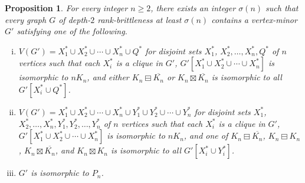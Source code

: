 \documentclass[11pt]{article}
\newtheorem{proposition}[theorem]{Proposition}
\newcommand\mat{\boxminus}
\newcommand\antimat{\boxtimes}
\def\S_#1{\overline{K_{#1}}}
\begin{document}
        
		\begin{proposition}\label{prop:main2}
		For every integer $n\ge 2$, there exists an integer $\sigma(n)$ such that 
                every graph $G$ of depth-$2$ rank-brittleness at least  $\sigma(n)$ contains a vertex-minor $G'$ satisfying one of the following.
                \begin{enumerate}[(i)]
                \item $V(G')=X_1^*\cup X_2^*\cup\cdots \cup X_n^*\cup Q^*$
                  for disjoint sets $X_1^*$, $X_2^*,\ldots, X_n^*,Q^*$ of $n$ vertices
                  such
                  that each $X_i^*$ is a clique in $G'$,
                  $G'[X_1^*\cup X_2^*\cup \cdots \cup X_n^*]$ is isomorphic to $nK_n$,
                  and
                  either $K_n\mat \S_n$ or $K_n\antimat \S_n$
                  is isomorphic to all $G'[X_i^*\cup Q^*]$.
                \item $V(G')=X_1^*\cup X_2^*\cup\cdots \cup X_n^*\cup Y_1^*
                  \cup Y_2^*\cup\cdots\cup Y_n^*$
                  for disjoint sets $X_1^*$, $X_2^*,\ldots, X_n^*,Y_1^*,Y_2^*,\ldots,
                  Y_n^*$ of $n$ vertices
                  such
                  that each $X_i^*$ is a clique in $G'$,
                  $G'[X_1^*\cup X_2^*\cup \cdots \cup X_n^*]$ is isomorphic to $nK_n$,
                  and
                  one of  $K_n\mat \S_n$,
                  $K_n\mat K_n$,  $K_n\antimat \S_n$, 
                  and $K_n\antimat K_n$
                  is isomorphic to 
                  all $G'[X_i^*\cup Y_i^*]$.
                \item $G'$ is isomorphic to $P_n$.
                \end{enumerate}
		\end{proposition}
\end{document}
